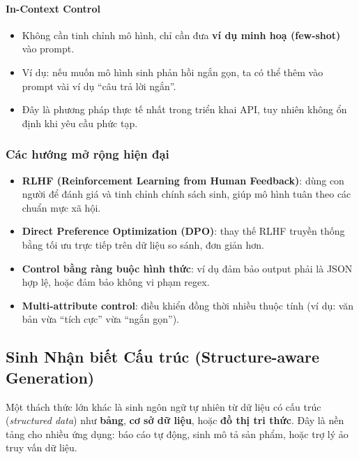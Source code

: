 \paragraph{In-Context Control}
\begin{itemize}
    \item Không cần tinh chỉnh mô hình, chỉ cần đưa \textbf{ví dụ minh hoạ (few-shot)} vào prompt.
    \item Ví dụ: nếu muốn mô hình sinh phản hồi ngắn gọn, ta có thể thêm vào prompt vài ví dụ ``câu trả lời ngắn''.
    \item Đây là phương pháp thực tế nhất trong triển khai API, tuy nhiên không ổn định khi yêu cầu phức tạp.
\end{itemize}

\subsubsection{Các hướng mở rộng hiện đại}
\begin{itemize}
    \item \textbf{RLHF (Reinforcement Learning from Human Feedback)}: dùng con người để đánh giá và tinh chỉnh chính sách sinh, giúp mô hình tuân theo các chuẩn mực xã hội.
    \item \textbf{Direct Preference Optimization (DPO)}: thay thế RLHF truyền thống bằng tối ưu trực tiếp trên dữ liệu so sánh, đơn giản hơn.
    \item \textbf{Control bằng ràng buộc hình thức}: ví dụ đảm bảo output phải là JSON hợp lệ, hoặc đảm bảo không vi phạm regex.
    \item \textbf{Multi-attribute control}: điều khiển đồng thời nhiều thuộc tính (ví dụ: văn bản vừa ``tích cực'' vừa ``ngắn gọn'').
\end{itemize}

\subsection{Sinh Nhận biết Cấu trúc (Structure-aware Generation)}
\label{ssec:structure_aware_generation}

Một thách thức lớn khác là sinh ngôn ngữ tự nhiên từ dữ liệu có cấu trúc (\textit{structured data}) như \textbf{bảng}, \textbf{cơ sở dữ liệu}, hoặc \textbf{đồ thị tri thức}. Đây là nền tảng cho nhiều ứng dụng: báo cáo tự động, sinh mô tả sản phẩm, hoặc trợ lý ảo truy vấn dữ liệu.

